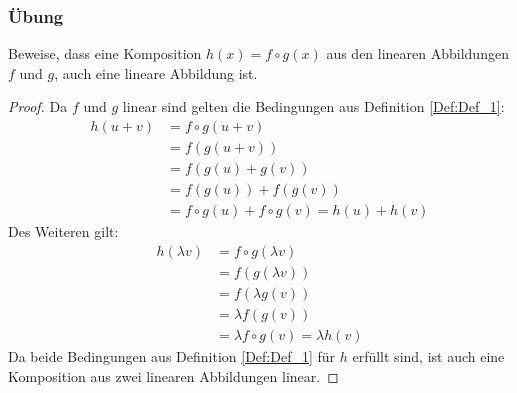 \subsubsection*{Übung}
Beweise, dass eine Komposition $h(x) = f \circ g (x)$ aus den linearen Abbildungen $f$ und $g$, auch eine lineare Abbildung ist.

\begin{proof}
Da $f$ und $g$ linear sind gelten die Bedingungen aus Definition \ref{Def:Def_1}:
\begin{align*}
	h(u+v) &= f \circ g(u+v)\\
	&= f(g(u+v))\\
	&= f(g(u)+g(v))\\
	&= f(g(u)) + f(g(v))\\
	&= f\circ g (u) + f\circ g (v) = h(u) + h(v)
\end{align*}
Des Weiteren gilt:
\begin{align*}
	h(\lambda v) &= f \circ g (\lambda v)\\
	&=f(g(\lambda v))\\
	&= f(\lambda g(v))\\
	&=\lambda f(g(v))\\
	&=\lambda f \circ g (v) = \lambda h(v)
\end{align*}
Da beide Bedingungen aus Definition \ref{Def:Def_1} für $h$ erfüllt sind, ist auch eine Komposition aus zwei linearen Abbildungen linear.
\end{proof}

